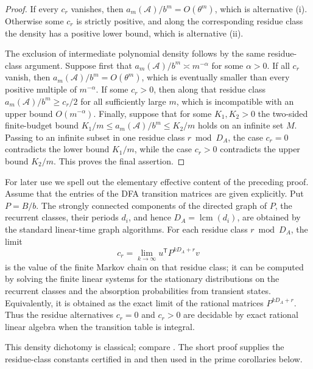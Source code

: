 \begin{proof}
  If every \(c_r\) vanishes, then
  \(a_m(\mathcal A)/b^m=O(\theta^m)\), which is alternative
  \textup{(i)}. Otherwise some \(c_r\) is strictly positive, and along
  the corresponding residue class the density has a positive lower
  bound, which is alternative \textup{(ii)}.

  The exclusion of intermediate polynomial density follows by the same
  residue-class argument. Suppose first that
  \(a_m(\mathcal A)/b^m\asymp m^{-\alpha}\) for some \(\alpha>0\).
  If all \(c_r\) vanish, then \(a_m(\mathcal A)/b^m=O(\theta^m)\), which
  is eventually smaller than every positive multiple of \(m^{-\alpha}\).
  If some \(c_r>0\), then along that residue class
  \(a_m(\mathcal A)/b^m\ge c_r/2\) for all sufficiently large \(m\),
  which is incompatible with an upper bound \(O(m^{-\alpha})\).
  Finally, suppose that for some \(K_1,K_2>0\) the two-sided
  finite-budget bound \(K_1/m\le a_m(\mathcal A)/b^m\le K_2/m\) holds
  on an infinite set \(M\). Passing to an infinite subset in one residue
  class \(r\bmod D_A\), the case \(c_r=0\) contradicts the lower bound
  \(K_1/m\), while the case \(c_r>0\) contradicts the upper bound
  \(K_2/m\). This proves the final assertion.
\end{proof}

For later use we spell out the elementary effective content of the
preceding proof. Assume that the entries of the DFA transition matrices
are given explicitly. Put \(P=B/b\). The strongly connected components
of the directed graph of \(P\), the recurrent classes, their periods
\(d_i\), and hence \(D_A=\operatorname{lcm}(d_i)\), are obtained by the
standard linear-time graph algorithms. For each residue class \(r\bmod
D_A\), the limit
\[
  c_r=\lim_{k\to\infty}u^{\mathsf T}P^{kD_A+r}v
\]
is the value of the finite Markov chain on that residue class; it can be
computed by solving the finite linear systems for the stationary
distributions on the recurrent classes and the absorption probabilities
from transient states. Equivalently, it is obtained as the exact
limit of the rational matrices \(P^{kD_A+r}\). Thus the residue
alternatives \(c_r=0\) and \(c_r>0\) are decidable by exact rational
linear algebra when the transition table is integral.

This density dichotomy is classical; compare
\cite{Berstel1973,BodirskyGaertnerVonOertzenSchwinghammer2004,Bell2020UpperDensity,Koga2019Density}.
The short proof supplies the residue-class constants certified in
 and then used in the
prime corollaries below.

